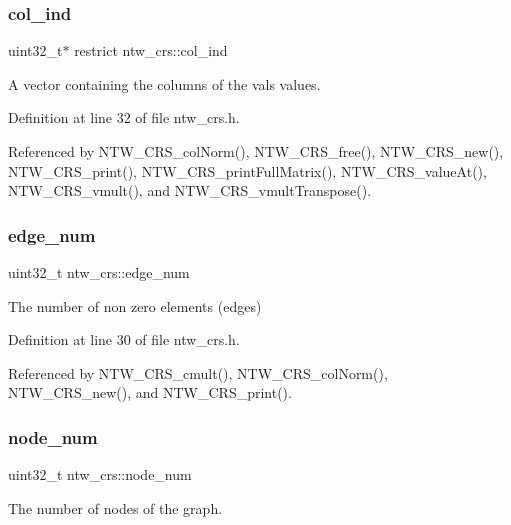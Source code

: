 \subsubsection{\texorpdfstring{col\+\_\+ind}{col\_ind}}
{\footnotesize\ttfamily uint32\+\_\+t$\ast$ restrict ntw\+\_\+crs\+::col\+\_\+ind}

A vector containing the columns of the val\textquotesingle{}s values. 

Definition at line 32 of file ntw\+\_\+crs.\+h.



Referenced by N\+T\+W\+\_\+\+C\+R\+S\+\_\+col\+Norm(), N\+T\+W\+\_\+\+C\+R\+S\+\_\+free(), N\+T\+W\+\_\+\+C\+R\+S\+\_\+new(), N\+T\+W\+\_\+\+C\+R\+S\+\_\+print(), N\+T\+W\+\_\+\+C\+R\+S\+\_\+print\+Full\+Matrix(), N\+T\+W\+\_\+\+C\+R\+S\+\_\+value\+At(), N\+T\+W\+\_\+\+C\+R\+S\+\_\+vmult(), and N\+T\+W\+\_\+\+C\+R\+S\+\_\+vmult\+Transpose().

\mbox{\label{structntw__crs_a85160ebade6d93ba77c9e90f2f237cea}} 
\subsubsection{\texorpdfstring{edge\+\_\+num}{edge\_num}}
{\footnotesize\ttfamily uint32\+\_\+t ntw\+\_\+crs\+::edge\+\_\+num}

The number of non zero elements (edges) 

Definition at line 30 of file ntw\+\_\+crs.\+h.



Referenced by N\+T\+W\+\_\+\+C\+R\+S\+\_\+cmult(), N\+T\+W\+\_\+\+C\+R\+S\+\_\+col\+Norm(), N\+T\+W\+\_\+\+C\+R\+S\+\_\+new(), and N\+T\+W\+\_\+\+C\+R\+S\+\_\+print().

\mbox{\label{structntw__crs_a36a11fbae59bf6159e40cb18e5f37ada}} 
\subsubsection{\texorpdfstring{node\+\_\+num}{node\_num}}
{\footnotesize\ttfamily uint32\+\_\+t ntw\+\_\+crs\+::node\+\_\+num}

The number of nodes of the graph. 

